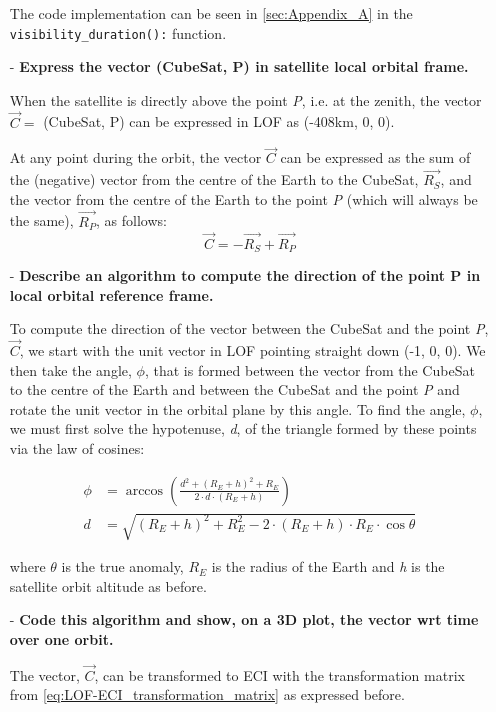 \begin{itemize}
    The code implementation can be seen in \autoref{sec:Appendix_A} in the \verb|visibility_duration():| function.


    \newpage
    \item[-] \textbf{Express the vector (CubeSat, P) in satellite local orbital frame.}

    When the satellite is directly above the point \textit{P}, i.e. at the zenith, the vector $\Vec{C}=$ (CubeSat, P) can be expressed in LOF as (-408km, 0, 0). 

    At any point during the orbit, the vector $\Vec{C}$ can be expressed as the sum of the (negative) vector from the centre of the Earth to the CubeSat, $\Vec{R_S}$, and the vector from the centre of the Earth to the point \textit{P} (which will always be the same), $\Vec{R_P}$, as follows:
    \begin{equation}
        \label{eq:vector_C}
        \Vec{C} = -\Vec{R_S} + \Vec{R_P}
    \end{equation}

    
    \item[-] \textbf{Describe an algorithm to compute the direction of the point P in local orbital reference frame.}

    To compute the direction of the vector between the CubeSat and the point \textit{P}, $\Vec{C}$, we start with the unit vector in LOF pointing straight down (-1, 0, 0).
    We then take the angle, $\phi$, that is formed between the vector from the CubeSat to the centre of the Earth and between the CubeSat and the point \textit{P} and rotate the unit vector in the orbital plane by this angle. 
    To find the angle, $\phi$, we must first solve the hypotenuse, \textit{d}, of the triangle formed by these points via the law of cosines:

    \begin{equation}
    \label{eq:direction_p_LOF}
        \begin{split}
            \phi &= \arccos{\left( \frac{d^2 + (R_E + h)^2 + R_E}{2 \cdot d \cdot (R_E + h)} \right)} \\
            d &= \sqrt{(R_E + h)^2 + R_E^2 - 2 \cdot (R_E + h) \cdot R_E \cdot \cos{\theta}} 
        \end{split}
    \end{equation}

    where $\theta$ is the true anomaly, $R_E$ is the radius of the Earth and \textit{h} is the satellite orbit altitude as before.


    
    \item[-] \textbf{Code this algorithm and show, on a 3D plot, the vector wrt time over one orbit.}

    The vector, $\Vec{C}$, can be transformed to ECI with the transformation matrix from \autoref{eq:LOF-ECI_transformation_matrix} as expressed before.
    
\end{itemize}